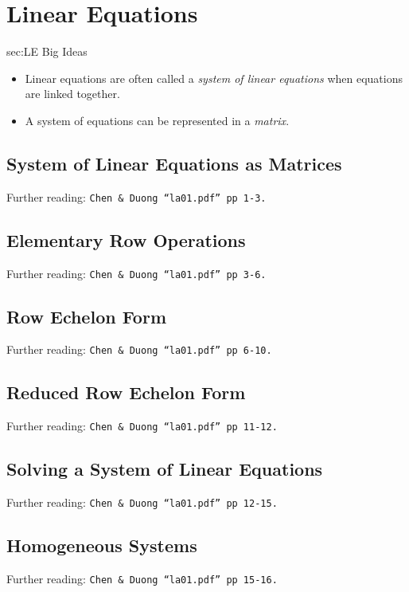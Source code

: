 \chapter{Linear Equations}
\label{chap:LE}

\begin{bigideas}{sec:LE Big Ideas}
\begin{itemize}
  \item Linear equations are often called a \emph{system of linear equations}
  when equations are linked together.
  \item A system of equations can be represented in a \emph{matrix}.
\end{itemize}
\end{bigideas}

\section{System of Linear Equations as Matrices}
\label{sec:LE System of Linear Equations as Matrices}
Further reading: \texttt{Chen \& Duong ``la01.pdf'' pp 1-3.}

\section{Elementary Row Operations}
\label{sec:LE Elementary Row Operations}
Further reading: \texttt{Chen \& Duong ``la01.pdf'' pp 3-6.}

\section{Row Echelon Form}
\label{sec:LE Row Echelon Form}
Further reading: \texttt{Chen \& Duong ``la01.pdf'' pp 6-10.}

\section{Reduced Row Echelon Form}
\label{sec:LE Reduced Row Echelon Form}
Further reading: \texttt{Chen \& Duong ``la01.pdf'' pp 11-12.}

\section{Solving a System of Linear Equations}
\label{sec:LE Solving a System of Linear Equations}
Further reading: \texttt{Chen \& Duong ``la01.pdf'' pp 12-15.}

\section{Homogeneous Systems}
\label{sec:LE Homogeneous Systems}
Further reading: \texttt{Chen \& Duong ``la01.pdf'' pp 15-16.}